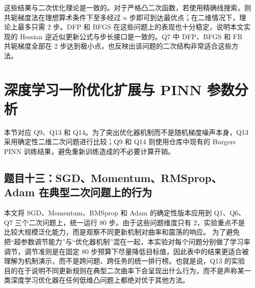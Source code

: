 \documentclass[UTF8,a4paper,12pt,fontset=none]{ctexart}
\begin{document}
这些结果与二次优化理论是一致的。对于严格凸二次函数，若使用精确线搜索，则共轭梯度法在理想算术条件下至多经过 $n$ 步即可到达最优点；在二维情况下，理论上最多只需 2 步。DFP 和 BFGS 在这些问题上的表现也十分稳定，说明本文实现的 Hessian 逆近似更新公式与步长接口是一致的。Q7 中 DFP、BFGS 和 FR 共轭梯度全部在 2 步达到极小点，也反映出该问题的二次结构非常适合这些方法。

\section{深度学习一阶优化扩展与 PINN 参数分析}

本节对应 Q9、Q13 和 Q14。为了突出优化器机制而不是随机梯度噪声本身，Q13 采用确定性二维二次问题进行比较；Q9 和 Q14 则使用仓库中现有的 Burgers PINN 训练结果，避免重新训练造成的不必要计算开销。

\subsection{题目十三：SGD、Momentum、RMSprop、Adam 在典型二次问题上的行为}

本文将 SGD、Momentum、RMSprop 和 Adam 的确定性版本应用到 Q1、Q6、Q7 三个二次问题上，统一运行 80 步。由于这些问题维度只有 2，实验重点不是比较大规模泛化能力，而是观察不同更新机制对曲率和震荡的响应。
为了避免把“超参数调节能力”与“优化器机制”混在一起，本实验对每个问题分别做了学习率调节，调节准则是在固定 80 步预算下尽量降低目标值，因此表中的结果更适合被理解为机制演示，而不是跨问题、跨任务的统一排行榜。也就是说，Q13 的实验目的在于说明不同更新规则在典型二次曲率下会呈现出什么行为，而不是声称某一类深度学习优化器在任何低维凸问题上都绝对优于其他方法。
\end{document}
